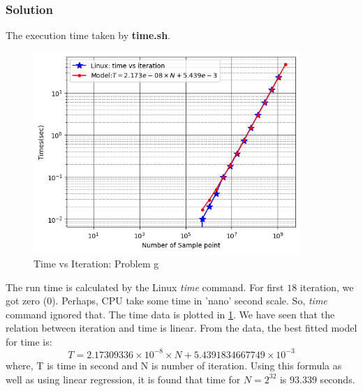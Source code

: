 \documentclass{article}
\begin{document}
\subsubsection*{Solution}
The execution time taken by \textbf{time.sh}.

\begin{figure}[h!]
  \centering
    \includegraphics[width=0.9\textwidth]{Time_vs_Number_of_Sample_point_curve}
    \caption{Time vs Iteration: Problem g} 
    \label{time}
\end{figure}

The run time is calculated by the Linux \textit{time} command. For first $18$ iteration, we got zero (0). Perhaps, CPU take some time in 'nano' second scale. So, \textit{time} command ignored that. The time data is plotted in \ref{time}. We have seen that the relation between iteration and time is linear. From the data, the best fitted model for time is: 
$$
T = 2.17309336\times 10^{-8} \times N + 5.4391834667749 \times 10^{-3} 
$$
where, T is time in second and N is number of iteration. Using this formula as well as using linear regression, it is found that time for $N = 2^{32}$ is $93.339$ seconds.
$$$$
\end{document}
